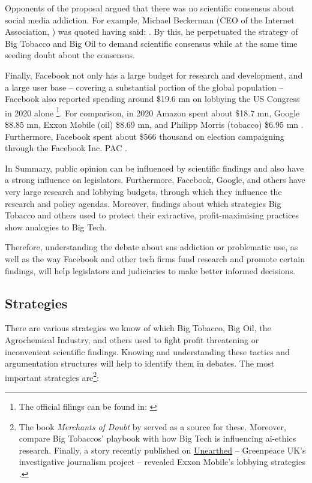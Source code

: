 Opponents of the proposal argued that there was no scientific consensus about social media addiction.
For example, Michael Beckerman (CEO of the Internet Association, \citep{rifkin_social_2019}) was quoted having said:  \citep{stewart_josh_2019}. 
By this, he perpetuated the strategy of Big Tobacco and Big Oil to demand scientific consensus while at the same time seeding doubt about the consensus.

Finally, Facebook not only has a large budget for research and development, and a large user base -- covering a substantial portion of the global population -- Facebook also reported spending around \$19.6 \gls{mn} on lobbying the US Congress in 2020 alone \citep{opensecrets_facebook_2021-1}\footnote{The official filings can be found in: \citep{maurer_ld-2_2020-2, maurer_ld-2_2020-1, maurer_ld-2_2020, maurer_ld-2_2021}}.
For comparison, in 2020 Amazon spent about \$18.7 \gls{mn}, Google \$8.85 \gls{mn}, Exxon Mobile (oil) \$8.69 \gls{mn}, and Philipp Morris (tobacco) \$6.95 \gls{mn} \citep{khaled_facebook_2021, opensecrets_amazoncom_2021, opensecrets_alphabet_2021, opensecrets_exxon_2021, opensecrets_philip_2021}.
Furthermore, Facebook spent about \$566 thousand on election campaigning through the Facebook Inc. PAC \citep{opensecrets_facebook_2021}.

In Summary, public opinion can be influenced by scientific findings and also have a strong influence on legislators. Furthermore, Facebook, Google, and others have very large research and lobbying budgets, through which they influence the research and policy agendas.
Moreover, findings about which strategies Big Tobacco and others used to protect their extractive, profit-maximising practices show analogies to Big Tech.

Therefore, understanding the debate about \gls{sns} addiction or problematic use, as well as the way Facebook and other tech firms fund research and promote certain findings,  will help legislators and judiciaries to make better informed decisions.

\subsection{Strategies}
There are various strategies we know of which Big Tobacco, Big Oil, the Agrochemical Industry, and others used to fight profit threatening or inconvenient scientific findings.
Knowing and understanding these tactics and argumentation structures will help to identify them in debates.
The most important strategies are\footnote{The book \emph{Merchants of Doubt} by \citet{oreskes_merchants_2010} served as a source for these. Moreover, \citet{abdalla_grey_2021} compare Big Tobaccos' playbook with how Big Tech is influencing \gls{ai}-ethics research. Finally, a story recently published on \href{https://unearthed.greenpeace.org/}{Unearthed} -- Greenpeace UK's investigative journalism project -- revealed Exxon Mobile's lobbying strategies \citep{carter_inside_2021}.}:

